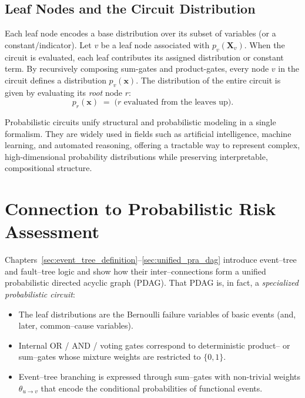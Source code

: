\subsection{Leaf Nodes and the Circuit Distribution}

Each leaf node encodes a base distribution over its subset of variables (or a constant/indicator). Let \(v\) be a leaf node associated with \(p_v(\mathbf{X}_v)\). When the circuit is evaluated, each leaf contributes its assigned distribution or constant term. By recursively composing sum-gates and product-gates, every node \(v\) in the circuit defines a distribution \(p_v(\mathbf{x})\). The distribution of the entire circuit is given by evaluating its \emph{root} node \(r\):
\[
p_r(\mathbf{x}) \;=\; \text{(\(r\) evaluated from the leaves up)}.
\]

Probabilistic circuits unify structural and probabilistic modeling in a single formalism. They are widely used in fields such as artificial intelligence, machine learning, and automated reasoning, offering a tractable way to represent complex, high-dimensional probability distributions while preserving interpretable, compositional structure.

\section{Connection to Probabilistic Risk Assessment}
\label{sec:pc_pra_connection}

Chapters~\ref{sec:event_tree_definition}--\ref{sec:unified_pra_dag} introduce event–tree and fault–tree logic and show how their inter–connections form a unified probabilistic directed acyclic graph (PDAG).  That PDAG is, in fact, a  \emph{specialized probabilistic circuit}: 
\begin{itemize}
  \item The leaf distributions are the Bernoulli failure variables of basic events (and, later, common–cause variables).
  \item Internal OR / AND / voting gates correspond to deterministic product– or sum–gates whose mixture weights are restricted to $\{0,1\}$.
  \item Event–tree branching is expressed through sum–gates with non-trivial weights $\theta_{u\to v}$ that encode the conditional probabilities of functional events.
\end{itemize}

